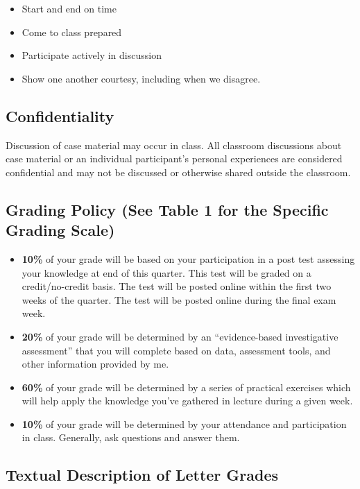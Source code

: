 \documentclass[11pt,]{article}
\providecommand{\tightlist}{%
  \setlength{\itemsep}{0pt}\setlength{\parskip}{0pt}}
\begin{document}
\begin{itemize}
\tightlist
\item
  Start and end on time
\item
  Come to class prepared
\item
  Participate actively in discussion
\item
  Show one another courtesy, including when we disagree.
\end{itemize}

\subsection{Confidentiality}\label{confidentiality}

Discussion of case material may occur in class. All classroom
discussions about case material or an individual participant's personal
experiences are considered confidential and may not be discussed or
otherwise shared outside the classroom.

\subsection{Grading Policy (See Table 1 for the Specific Grading
Scale)}\label{grading-policy-see-table-1-for-the-specific-grading-scale}

\begin{itemize}
\item
  \textbf{10\%} of your grade will be based on your participation in a
  post test assessing your knowledge at end of this quarter. This test
  will be graded on a credit/no-credit basis. The test will be posted
  online within the first two weeks of the quarter. The test will be
  posted online during the final exam week.
\item
  \textbf{20\%} of your grade will be determined by an ``evidence-based
  investigative assessment'' that you will complete based on data,
  assessment tools, and other information provided by me.
\item
  \textbf{60\%} of your grade will be determined by a series of
  practical exercises which will help apply the knowledge you've
  gathered in lecture during a given week.
\item
  \textbf{10\%} of your grade will be determined by your attendance and
  participation in class. Generally, ask questions and answer them.
\end{itemize}

\subsection{Textual Description of Letter
Grades}\label{textual-description-of-letter-grades}
\end{document}
